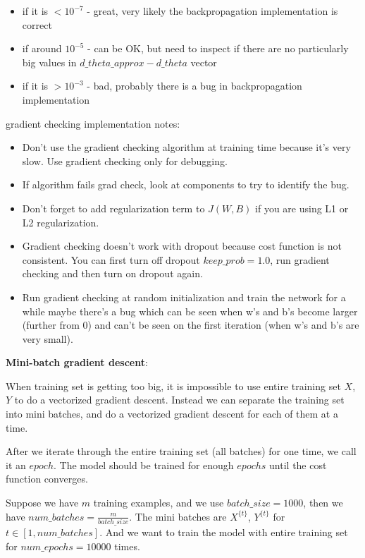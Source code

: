 \documentclass{article}
\begin{document}
\begin{itemize}
  \item if it is \(< 10^{-7}\) - great, very likely the backpropagation implementation is correct
  \item if around \(10^{-5}\) - can be OK, but need to inspect if there are no particularly big values in \(d\_theta\_approx - d\_theta\) vector
  \item if it is \(> 10^{-3}\) - bad, probably there is a bug in backpropagation implementation
\end{itemize}

\noindent gradient checking implementation notes:

\begin{itemize}
  \item Don't use the gradient checking algorithm at training time because it's very slow. Use gradient checking only for debugging.
  \item If algorithm fails grad check, look at components to try to identify the bug.
  \item Don't forget to add regularization term to \(J(W, B)\) if you are using L1 or L2 regularization.
  \item Gradient checking doesn't work with dropout because cost function is not consistent. You can first turn off dropout \(keep\_prob = 1.0\), run gradient checking and then turn on dropout again.
  \item Run gradient checking at random initialization and train the network for a while maybe there's a bug which can be seen when w's and b's become larger (further from 0) and can't be seen on the first iteration (when w's and b's are very small).
\end{itemize}

\noindent \textbf{Mini-batch gradient descent}:

\noindent When training set is getting too big, it is impossible to use entire training set \(X\), \(Y\) to do a vectorized gradient descent. Instead we can separate the training set into mini batches, and do a vectorized gradient descent for each of them at a time.

\bigskip

\noindent After we iterate through the entire training set (all batches) for one time, we call it an \(epoch\). The model should be trained for enough \(epochs\) until the cost function converges.

\bigskip

\noindent Suppose we have \(m\) training examples, and we use \(batch\_size = 1000\), then we have \(num\_batches = \frac{m}{batch\_size}\). The mini batches are \(X^{\{t\}}\), \(Y^{\{t\}}\) for \(t \in [1, num\_batches]\). And we want to train the model with entire training set for \(num\_epochs = 10000\) times.
\end{document}
